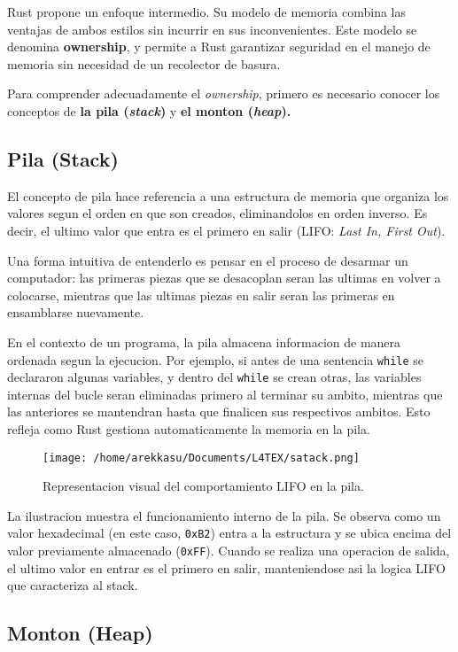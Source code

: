 \documentclass[12pt]{article}
\begin{document}
Rust propone un enfoque intermedio. Su modelo de memoria combina las ventajas de ambos estilos sin incurrir en sus inconvenientes. Este modelo se denomina \textbf{ownership}, y permite a Rust garantizar seguridad en el manejo de memoria sin necesidad de un recolector de basura.

Para comprender adecuadamente el \textit{ownership}, primero es necesario conocer los conceptos de \textbf{la pila (\textit{stack})} y \textbf{el monton (\textit{heap}).}

\subsection{Pila (Stack)}

El concepto de pila hace referencia a una estructura de memoria que organiza los valores segun el orden en que son creados, eliminandolos en orden inverso. Es decir, el ultimo valor que entra es el primero en salir (LIFO: \textit{Last In, First Out}).

Una forma intuitiva de entenderlo es pensar en el proceso de desarmar un computador: las primeras piezas que se desacoplan seran las ultimas en volver a colocarse, mientras que las ultimas piezas en salir seran las primeras en ensamblarse nuevamente.

En el contexto de un programa, la pila almacena informacion de manera ordenada segun la ejecucion. Por ejemplo, si antes de una sentencia \texttt{while} se declararon algunas variables, y dentro del \texttt{while} se crean otras, las variables internas del bucle seran eliminadas primero al terminar su ambito, mientras que las anteriores se mantendran hasta que finalicen sus respectivos ambitos. Esto refleja como Rust gestiona automaticamente la memoria en la pila.


\begin{figure}[H]
	\centering
	\texttt{[image: /home/arekkasu/Documents/L4TEX/satack.png]}
	\caption{Representacion visual del comportamiento LIFO en la pila.}
\end{figure}

La ilustracion muestra el funcionamiento interno de la pila. Se observa como un valor hexadecimal (en este caso, \texttt{0xB2}) entra a la estructura y se ubica encima del valor previamente almacenado (\texttt{0xFF}). Cuando se realiza una operacion de salida, el ultimo valor en entrar es el primero en salir, manteniendose asi la logica LIFO que caracteriza al stack.


\subsection{Monton (Heap)}
\end{document}
